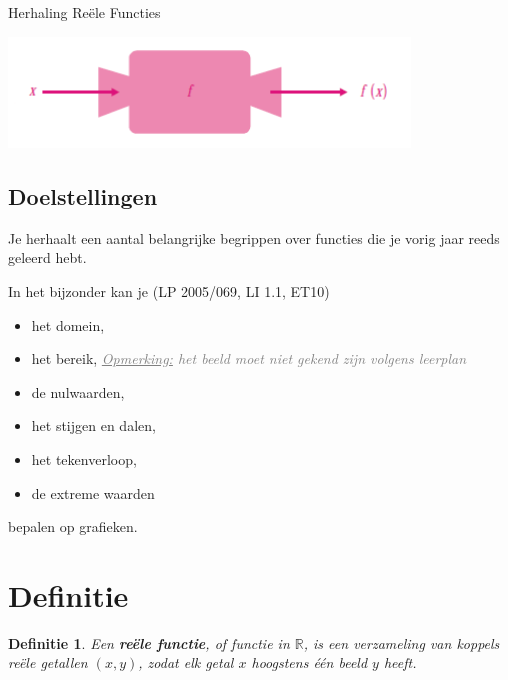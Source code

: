 \documentclass[12pt,twoside]{article}
\newcommand{\teacher}[1]{\textcolor{gray}{\emph{\underline{Opmerking:} #1}}}
\newcommand{\teacher}[1]{}
\newtheorem{definition}{Definitie}
\begin{document}
\thispagestyle{empty}
\begin{center}
  \begin{mdframed}
  \centering
  \fontsize{35}{70}\selectfont Herhaling Reële Functies
  \end{mdframed}
  \vfill
  \includegraphics[width=0.8\textwidth]{FunctieMachine}
  \vfill
\end{center}
\vspace*{-2cm}
\subsection*{Doelstellingen}
{\singlespacing

Je herhaalt een aantal belangrijke begrippen over functies die je vorig jaar reeds geleerd hebt.

In het bijzonder kan je \hfill  {\scriptsize(LP 2005/069, LI 1.1, ET10)}
\begin{itemize}
  \item het domein,
  \item het bereik, \teacher{het beeld moet niet gekend zijn volgens leerplan}
  \item de nulwaarden,
  \item het stijgen en dalen,
  \item het tekenverloop,
  \item de extreme waarden
\end{itemize}
bepalen op grafieken.
}

\fancyhead[RE,LO]{}

\onehalfspacing

\pagebreak
\section{Definitie}

\begin{definition}
Een {\bf reële functie}, of functie in $\mathbb{R}$, is een verzameling van {\em koppels} reële getallen $(x,y)$, zodat elk getal $x$ {\em hoogstens één beeld} $y$ heeft.
\end{definition}
\end{document}
